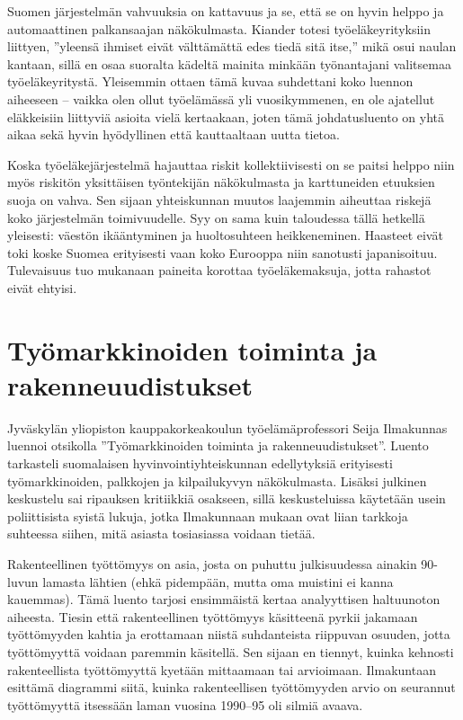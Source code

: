 \documentclass[12pt]{article}
\begin{document}
Suomen järjestelmän vahvuuksia on kattavuus ja se, että se on hyvin helppo ja automaattinen palkansaajan näkökulmasta. Kiander totesi työeläkeyrityksiin liittyen, ''yleensä ihmiset eivät välttämättä edes tiedä sitä itse,'' mikä osui naulan kantaan, sillä en osaa suoralta kädeltä mainita minkään työnantajani valitsemaa työeläkeyritystä. Yleisemmin ottaen tämä kuvaa suhdettani koko luennon aiheeseen -- vaikka olen ollut työelämässä yli vuosikymmenen, en ole ajatellut eläkkeisiin liittyviä asioita vielä kertaakaan, joten tämä johdatusluento on yhtä aikaa sekä hyvin hyödyllinen että kauttaaltaan uutta tietoa.

Koska työeläkejärjestelmä hajauttaa riskit kollektiivisesti on se paitsi helppo niin myös riskitön yksittäisen työntekijän näkökulmasta ja karttuneiden etuuksien suoja on vahva. Sen sijaan yhteiskunnan muutos laajemmin aiheuttaa riskejä koko järjestelmän toimivuudelle. Syy on sama kuin taloudessa tällä hetkellä yleisesti: väestön ikääntyminen ja huoltosuhteen heikkeneminen. Haasteet eivät toki koske Suomea erityisesti vaan koko Eurooppa niin sanotusti japanisoituu. Tulevaisuus tuo mukanaan paineita korottaa työeläkemaksuja, jotta rahastot eivät ehtyisi.


\newpage
\section{Työmarkkinoiden toiminta ja rakenneuudistukset}

Jyväskylän yliopiston kauppakorkeakoulun työelämäprofessori Seija Ilmakunnas luennoi otsikolla ''Työmarkkinoiden toiminta ja rakenneuudistukset''. Luento tarkasteli suomalaisen hyvinvointiyhteiskunnan edellytyksiä erityisesti työmarkkinoiden, palkkojen ja kilpailukyvyn näkökulmasta. Lisäksi julkinen keskustelu sai ripauksen kritiikkiä osakseen, sillä keskusteluissa käytetään usein poliittisista syistä lukuja, jotka Ilmakunnaan mukaan ovat liian tarkkoja suhteessa siihen, mitä asiasta tosiasiassa voidaan tietää.

Rakenteellinen työttömyys on asia, josta on puhuttu julkisuudessa ainakin 90-luvun lamasta lähtien (ehkä pidempään, mutta oma muistini ei kanna kauemmas). Tämä luento tarjosi ensimmäistä kertaa analyyttisen haltuunoton aiheesta. Tiesin että rakenteellinen työttömyys käsitteenä pyrkii jakamaan työttömyyden kahtia ja erottamaan niistä suhdanteista riippuvan osuuden, jotta työttömyyttä voidaan paremmin käsitellä. Sen sijaan en tiennyt, kuinka kehnosti rakenteellista työttömyyttä kyetään mittaamaan tai arvioimaan. Ilmakuntaan esittämä diagrammi siitä, kuinka rakenteellisen työttömyyden arvio on seurannut työttömyyttä itsessään laman vuosina 1990--95 oli silmiä avaava.
\end{document}
